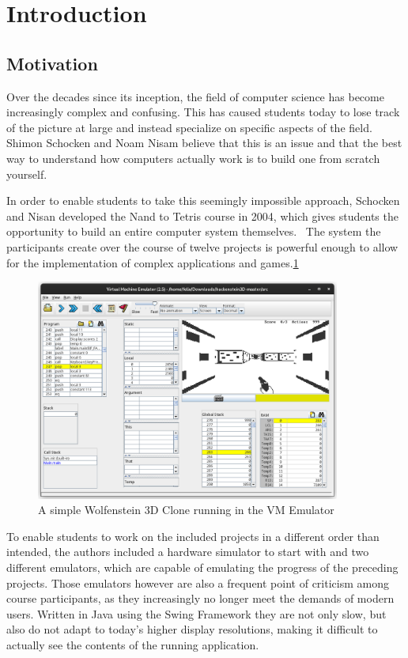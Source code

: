 \section{Introduction}

\subsection{Motivation}

Over the decades since its inception, the field of computer science has become increasingly complex and confusing.
This has caused students today to lose track of the picture at large and instead specialize on specific aspects of the field.
Shimon Schocken and Noam Nisam believe that this is an issue and that the best way to understand how computers actually work is to build one from scratch yourself.~\cite[Preface]{nisan2005}

In order to enable students to take this seemingly impossible approach, Schocken and Nisan developed the Nand to Tetris course in 2004, which gives students the opportunity to build an entire computer system themselves.~\cite{1408798}
The system the participants create over the course of twelve projects is powerful enough to allow for the implementation of complex applications and games.\ref{fig:hackenstein-offiziell}

\begin{center}
  \begin{figure}[ht]
    \centering
    \includegraphics[width=10cm]{fig/hackenstein-offiziell.png}
    \caption{A simple Wolfenstein 3D Clone running in the VM Emulator}%
    \label{fig:hackenstein-offiziell}
  \end{figure}
\end{center}

To enable students to work on the included projects in a different order than intended, the authors included a hardware simulator to start with and two different emulators, which are capable of emulating the progress of the preceding projects.
Those emulators however are also a frequent point of criticism among course participants, as they increasingly no longer meet the demands of modern users.
Written in Java using the Swing Framework they are not only slow, but also do not adapt to today's higher display resolutions, making it difficult to actually see the contents of the running application.

